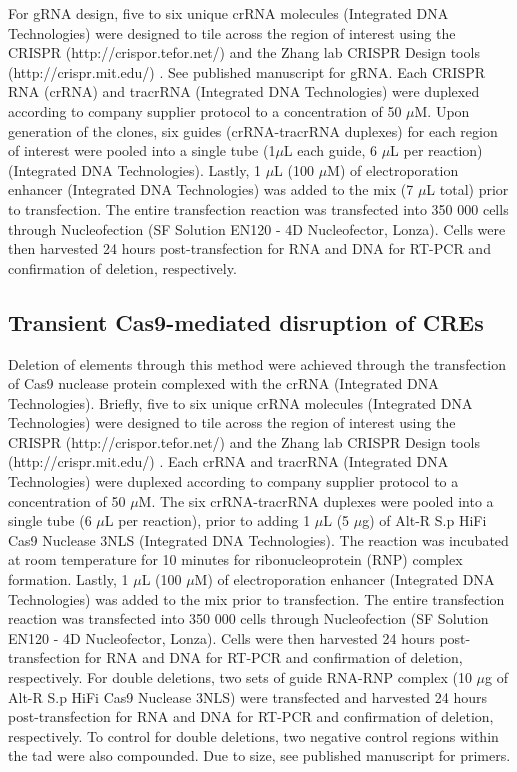 For gRNA design, five to six unique crRNA molecules (Integrated DNA Technologies) were designed to tile across the region of interest using the CRISPR (http://crispor.tefor.net/) \cite{haeusslerEvaluationOfftargetOntarget2016} and the Zhang lab CRISPR Design tools (http://crispr.mit.edu/) \cite{hsuDNATargetingSpecificity2013}.
See published manuscript for gRNA.
Each CRISPR RNA (crRNA) and tracrRNA (Integrated DNA Technologies) were duplexed according to company supplier protocol to a concentration of 50 $\mu$M.
Upon generation of the clones, six guides (crRNA-tracrRNA duplexes) for each region of interest were pooled into a single tube (1$\mu$L each guide, 6 $\mu$L per reaction) (Integrated DNA Technologies).
Lastly, 1 $\mu$L (100 $\mu$M) of electroporation enhancer (Integrated DNA Technologies) was added to the mix (7 $\mu$L total) prior to transfection.
The entire transfection reaction was transfected into 350 000 cells through Nucleofection (SF Solution EN120 - 4D Nucleofector, Lonza).
Cells were then harvested 24 hours post-transfection for RNA and DNA for RT-PCR and confirmation of deletion, respectively.

\subsection{Transient Cas9-mediated disruption of CREs}

Deletion of elements through this method were achieved through the transfection of Cas9 nuclease protein complexed with the crRNA (Integrated DNA Technologies).
Briefly, five to six unique crRNA molecules (Integrated DNA Technologies) were designed to tile across the region of interest using the CRISPR (http://crispor.tefor.net/) \cite{haeusslerEvaluationOfftargetOntarget2016} and the Zhang lab CRISPR Design tools (http://crispr.mit.edu/) \cite{hsuDNATargetingSpecificity2013}.
Each crRNA and tracrRNA (Integrated DNA Technologies) were duplexed according to company supplier protocol to a concentration of 50 $\mu$M.
The six crRNA-tracrRNA duplexes were pooled into a single tube (6 $\mu$L per reaction), prior to adding 1 $\mu$L (5 $\mu$g) of Alt-R \textregistered S.p HiFi Cas9 Nuclease 3NLS (Integrated DNA Technologies).
The reaction was incubated at room temperature for 10 minutes for ribonucleoprotein (RNP) complex formation.
Lastly, 1 $\mu$L (100 $\mu$M) of electroporation enhancer (Integrated DNA Technologies) was added to the mix prior to transfection.
The entire transfection reaction was transfected into 350 000 cells through Nucleofection (SF Solution EN120 - 4D Nucleofector, Lonza).
Cells were then harvested 24 hours post-transfection for RNA and DNA for RT-PCR and confirmation of deletion, respectively.
For double deletions, two sets of guide RNA-RNP complex (10 $\mu$g of Alt-R \textregistered S.p HiFi Cas9 Nuclease 3NLS) were transfected and harvested 24 hours post-transfection for RNA and DNA for RT-PCR and confirmation of deletion, respectively.
To control for double deletions, two negative control regions within the \gls{tad} were also compounded.
Due to size, see published manuscript for primers.

